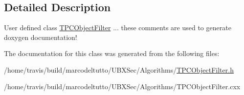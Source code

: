 \subsection{Detailed Description}
User defined class \hyperlink{classubana_1_1TPCObjectFilter}{T\-P\-C\-Object\-Filter} ... these comments are used to generate doxygen documentation! 

The documentation for this class was generated from the following files\-:\begin{DoxyCompactItemize}
\item 
/home/travis/build/marcodeltutto/\-U\-B\-X\-Sec/\-Algorithms/\hyperlink{TPCObjectFilter_8h}{T\-P\-C\-Object\-Filter.\-h}\item 
/home/travis/build/marcodeltutto/\-U\-B\-X\-Sec/\-Algorithms/T\-P\-C\-Object\-Filter.\-cxx\end{DoxyCompactItemize}
